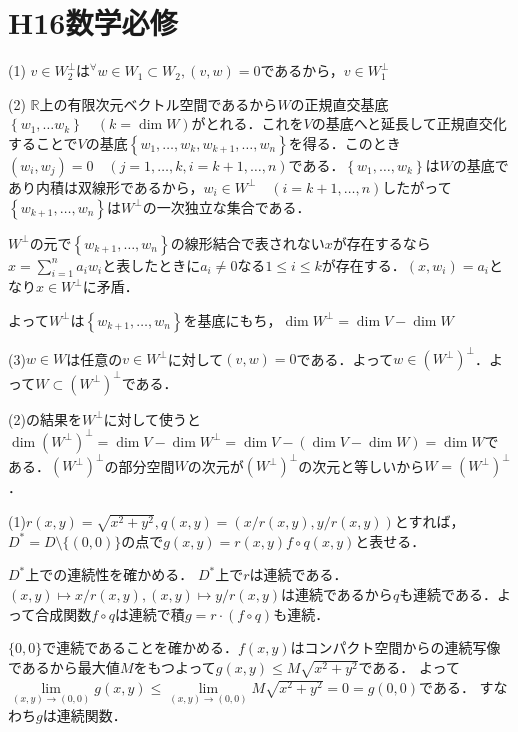 \documentclass[
		book,
		head_space=20mm,
		foot_space=20mm,
		gutter=10mm,
		line_length=190mm
]{jlreq}
\begin{document}
\section{H16数学必修}
(1) $v\in W_2^{\bot}$は${}^\forall w \in W_1\subset W_2,(v,w)=0$であるから，$v \in W_1^{\bot}$

(2)
$\mathbb{R}$上の有限次元ベクトル空間であるから$W$の正規直交基底
$\left\{ w_1,\dots w_k \right\}\quad (k=\dim W)$がとれる．これを$V$の基底へと延長して正規直交化することで$V$の基底$\left\{ w_1,\dots,w_k,w_{k+1},\dots,w_n \right\}$を得る．このとき$(w_i,w_j)=0\quad(j=1,\dots,k,i=k+1,\dots,n)$である．$\left\{  w_1,\dots,w_k \right\}$は$W$の基底であり内積は双線形であるから，$w_i\in W^{\bot}\quad(i=k+1,\dots,n)$したがって$\left\{ w_{k+1},\dots,w_n \right\}$は$W^{\bot}$の一次独立な集合である．

$W^{\bot}$の元で$\left\{ w_{k+1},\dots,w_n \right\}$の線形結合で表されない$x$が存在するなら$x=\sum\limits_{i=1}^n a_iw_i$と表したときに$a_i\neq 0$なる$1\le i \le k$が存在する．$(x,w_i)=a_i$となり$x\in W^{\bot}$に矛盾．

よって$W^{\bot} $は$\left\{ w_{k+1},\dots,w_n \right\}$を基底にもち，$\dim W^{\bot}= \dim V - \dim W$

(3)$w\in W$は任意の$v\in W^{\bot}$に対して$(v,w)=0$である．よって$w\in (W^{\bot})^{\bot}$．よって$W \subset (W^{\bot})^{\bot}$である．

(2)の結果を$W^{\bot}$に対して使うと
$\dim (W^{\bot})^{\bot} = \dim V - \dim W^{\bot}=\dim V - (\dim V-\dim W)=\dim W$である．$(W^{\bot})^{\bot}$の部分空間$W$の次元が$(W^{\bot})^{\bot}$の次元と等しいから$W=(W^{\bot})^{\bot}$．

(1)$r(x,y)=\sqrt{x^2+y^2},q(x,y)=(x/r(x,y),y/r(x,y))$とすれば，$D^*=D\setminus \{ (0,0)\}$の点で$g(x,y)=r(x,y)f\circ q(x,y)$と表せる．

$D^*$上での連続性を確かめる．
$D^*$上で$r$は連続である．$(x,y)\mapsto x/r(x,y),(x,y)\mapsto y/r(x,y)$は連続であるから$q$も連続である．よって合成関数$f \circ q$は連続で積$g=r \cdot(f\circ q)$も連続．

$\{ 0,0\}$で連続であることを確かめる．$f(x,y)$はコンパクト空間からの連続写像であるから最大値$M$をもつよって$g(x,y)\le M\sqrt{x^2+y^2}$である．
よって$\lim\limits_{(x,y)\to (0,0)}g(x,y) \le \lim\limits_{(x,y)\to (0,0)}M\sqrt{x^2+y^2} =0=g(0,0)$である．
すなわち$g$は連続関数．
\end{document}
